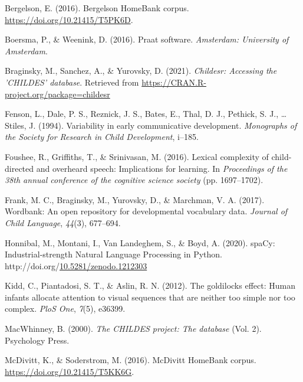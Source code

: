 \documentclass[10pt, letterpaper]{article}
\newenvironment{CSLReferences}%
  {}%
  {\par}
\begin{document}
\hypertarget{refs}{}
\begin{CSLReferences}{1}{0}
\leavevmode\hypertarget{ref-bergelsoncorpus}{}%
Bergelson, E. (2016). Bergelson HomeBank corpus.
\url{https://doi.org/10.21415/T5PK6D}.

\leavevmode\hypertarget{ref-boersma2016praat}{}%
Boersma, P., \& Weenink, D. (2016). Praat software. \emph{Amsterdam:
University of Amsterdam}.

\leavevmode\hypertarget{ref-braginsky2021childesr}{}%
Braginsky, M., Sanchez, A., \& Yurovsky, D. (2021). \emph{Childesr:
Accessing the 'CHILDES' database}. Retrieved from
\url{https://CRAN.R-project.org/package=childesr}

\leavevmode\hypertarget{ref-fenson1994variability}{}%
Fenson, L., Dale, P. S., Reznick, J. S., Bates, E., Thal, D. J.,
Pethick, S. J., \ldots{} Stiles, J. (1994). Variability in early
communicative development. \emph{Monographs of the Society for Research
in Child Development}, i--185.

\leavevmode\hypertarget{ref-foushee2016lexical}{}%
Foushee, R., Griffiths, T., \& Srinivasan, M. (2016). Lexical complexity
of child-directed and overheard speech: Implications for learning. In
\emph{Proceedings of the 38th annual conference of the cognitive science
society} (pp. 1697--1702).

\leavevmode\hypertarget{ref-frank2017wordbank}{}%
Frank, M. C., Braginsky, M., Yurovsky, D., \& Marchman, V. A. (2017).
Wordbank: An open repository for developmental vocabulary data.
\emph{Journal of Child Language}, \emph{44}(3), 677--694.

\leavevmode\hypertarget{ref-honnibal2020spacy}{}%
Honnibal, M., Montani, I., Van Landeghem, S., \& Boyd, A. (2020).
{spaCy: Industrial-strength Natural Language Processing in Python}.
http://doi.org/\href{https://doi.org/10.5281/zenodo.1212303}{10.5281/zenodo.1212303}

\leavevmode\hypertarget{ref-kidd2012goldilocks}{}%
Kidd, C., Piantadosi, S. T., \& Aslin, R. N. (2012). The goldilocks
effect: Human infants allocate attention to visual sequences that are
neither too simple nor too complex. \emph{PloS One}, \emph{7}(5),
e36399.

\leavevmode\hypertarget{ref-macwhinney2000childes}{}%
MacWhinney, B. (2000). \emph{The CHILDES project: The database} (Vol.
2). Psychology Press.

\leavevmode\hypertarget{ref-soderstromcorpus}{}%
McDivitt, K., \& Soderstrom, M. (2016). McDivitt HomeBank corpus.
\url{https://doi.org/10.21415/T5KK6G}.


\end{CSLReferences}
\end{document}
